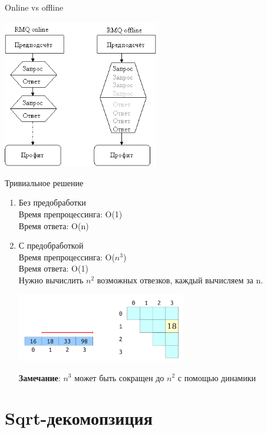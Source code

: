 \documentclass[10pt]{beamer}
\begin{document}
\begin{frame}[fragile]{Online vs offline}
\begin{center}
    \includegraphics[height=6.5cm]{Term_2/Source/images/rmq1.png}
\end{center}
\end{frame}

\begin{frame}[fragile]{Тривиальное решение}

\begin{enumerate}
    \item Без предобработки \\
Время препроцессинга: O(1)\\
Время ответа: O(n)\\
    \item С предобработкой\\
Время препроцессинга: O($n^3$)\\
Время ответа: O(1)\\
Нужно вычислить $n^2$ возможных отвезков, каждый вычисляем за n.
\begin{center}
    \includegraphics[height=3cm]{Term_2/Source/images/9-rmq-2.png}
\end{center}
\textbf{Замечание}: $n^3$ может быть сокращен до $n^2$ с помощью динамики
\end{enumerate}

\end{frame}


\section{Sqrt-декомопзиция}
\end{document}
